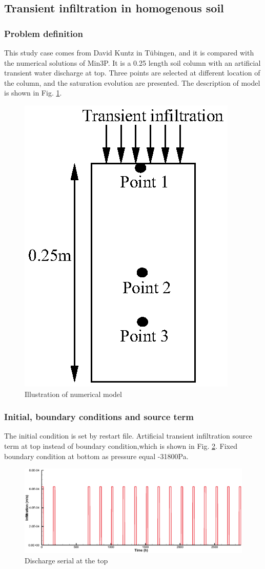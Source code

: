 \subsection{Transient infiltration in homogenous soil}

\subsubsection*{Problem definition}

This study case comes from David Kuntz in Tübingen, and it is
compared with the numerical solutions of Min3P. It is a 0.25
length soil column with an artificial transient water discharge at
top. Three points are selected at different location of the
column, and the saturation evolution are presented. The
description of model is
shown in Fig. \ref{us:illu-transient}.\\
\begin{figure} [h]
 \centering
 \includegraphics[width=0.30\columnwidth] {H_US/figures/illustration_Transient.eps}
 \caption{Illustration of numerical model}
 \label{us:illu-transient}
\end{figure}

\subsubsection*{Initial, boundary conditions and source term}
The initial condition is set by restart file. Artificial transient
infiltration source term at top instead of boundary
condition,which is shown in Fig. \ref{us:dischargetransient}.
Fixed boundary condition at bottom as pressure equal -31800Pa.\\

\begin{figure} [h]
 \centering
 \includegraphics[width=0.8\columnwidth] {H_US/figures/discharge_transient.eps}
 \caption{Discharge serial at the top}
 \label{us:dischargetransient}
\end{figure}

